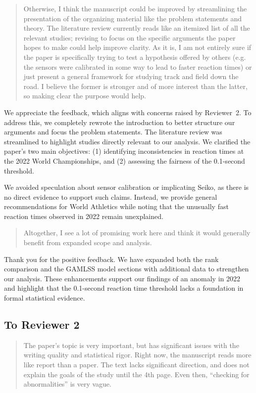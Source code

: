 \documentclass[12pt]{article}
\newenvironment{comment}%
{\begin{quotation}\noindent\small\it\color{darkblue}\ignorespaces%
}{\end{quotation}}
\begin{document}
\begin{comment}
Otherwise, I think the manuscript could be improved by streamlining the
presentation of the organizing material like the problem statements and theory.
The literature review currently reads like an itemized list of all the relevant
studies; revising to focus on the specific arguments the paper hopes to make
could help improve clarity. As it is, I am not entirely sure if the paper is
specifically trying to test a hypothesis offered by others (e.g. the sensors
were calibrated in some way to lead to faster reaction times) or just present a
general framework for studying track and field down the road. I believe the
former is stronger and of more interest than the latter, so making clear the
purpose would help.
\end{comment}

We appreciate the feedback, which aligns with concerns raised by
Reviewer~2. To address this, we completely rewrote the introduction to
better structure our arguments and focus the problem statements. The
literature review was streamlined to highlight studies directly
relevant to our analysis. We clarified the paper’s two main
objectives: (1) identifying inconsistencies in reaction times at the
2022 World Championships, and (2) assessing the fairness of the
0.1-second threshold.


We avoided speculation about sensor calibration or implicating Seiko,
as there is no direct evidence to support such claims. Instead, we
provide general recommendations for World Athletics while noting that
the unusually fast reaction times observed in 2022 remain unexplained.


\begin{comment}
Altogether, I see a lot of promising work here and think it would generally
benefit from expanded scope and analysis.
\end{comment}

Thank you for the positive feedback. We have expanded both the rank
comparison and the GAMLSS model sections with additional data to
strengthen our analysis. These enhancements support our findings of an
anomaly in 2022 and highlight that the 0.1-second reaction time
threshold lacks a foundation in formal statistical evidence.


\subsection*{To Reviewer 2}

\begin{comment}
The paper’s topic is very important, but has significant issues with the writing
quality and statistical rigor. Right now, the manuscript reads more like report
than a paper. The text lacks significant direction, and does not explain the
goals of the study until the 4th page. Even then, “checking for abnormalities”
is very vague.
\end{comment}
\end{document}
